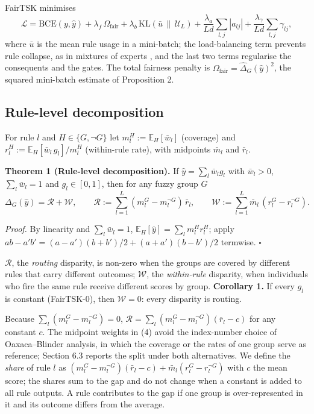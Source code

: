 FairTSK minimises \[\mathcal{L} = \mathrm{BCE}(y,\hat{y}) + \lambda_{f}\,\Omega_{\text{fair}} + \lambda_{b}\,\mathrm{KL}(\bar{u}\,\|\,\mathcal{U}_{L}) + \frac{\lambda_{a}}{Ld}\sum_{l,j}|a_{lj}| + \frac{\lambda_{\gamma}}{Ld}\sum_{l,j}\gamma_{lj}, \tag{3}\] where \(\bar{u}\) is the mean rule usage in a mini-batch; the load-balancing term prevents rule collapse, as in mixtures of experts \cite{shazeer}, and the last two terms regularise the consequents and the gates. The total fairness penalty is \(\Omega_{\text{fair}} = \hat{\Delta}_{G}(\hat y)^{2}\), the squared mini-batch estimate of Proposition 2.

\hypertarget{rule-level-decomposition}{%
\subsection{Rule-level decomposition}\label{rule-level-decomposition}}

For rule \(l\) and \(H \in \{G,\neg G\}\) let \(m_{l}^{H} := \mathbb{E}_{H}[\bar{w}_{l}]\) (coverage) and \(r_{l}^{H} := \mathbb{E}_{H}[\bar{w}_{l}\, g_{l}]/m_{l}^{H}\) (within-rule rate), with midpoints \(\bar{m}_{l}\) and \(\bar{r}_{l}\).

\textbf{Theorem 1 (Rule-level decomposition).} If \(\hat y = \sum_l \bar w_l g_l\) with \(\bar w_l > 0\), \(\sum_l \bar w_l = 1\) and \(g_l \in [0,1]\), then for any fuzzy group \(G\) \[\Delta_{G}(\hat{y}) = \mathcal{R} + \mathcal{W},\qquad \mathcal{R} := \sum_{l = 1}^{L}(m_{l}^{G} - m_{l}^{\neg G})\,\bar{r}_{l},\qquad \mathcal{W} := \sum_{l = 1}^{L}\bar{m}_{l}\,(r_{l}^{G} - r_{l}^{\neg G}). \tag{4}\]

\emph{Proof.} By linearity and \(\sum_l \bar w_l = 1\), \(\mathbb{E}_{H}[\hat{y}] = \sum_{l}m_{l}^{H}r_{l}^{H}\); apply \(ab - a'b' = (a - a')(b + b')/2 + (a + a')(b - b')/2\) termwise. \(\square\)

\(\mathcal R\), the \emph{routing} disparity, is non-zero when the groups are covered by different rules that carry different outcomes; \(\mathcal W\), the \emph{within-rule} disparity, when individuals who fire the same rule receive different scores by group. \textbf{Corollary 1.} If every \(g_l\) is constant (FairTSK-0), then \(\mathcal W = 0\): every disparity is routing.

Because \(\sum_l (m_l^G - m_l^{\neg G}) = 0\), \(\mathcal R = \sum_l (m_l^G - m_l^{\neg G})(\bar r_l - c)\) for any constant \(c\). The midpoint weights in (4) avoid the index-number choice of Oaxaca--Blinder analysis, in which the coverage or the rates of one group serve as reference; Section 6.3 reports the split under both alternatives. We define the \emph{share} of rule \(l\) as \((m_l^G - m_l^{\neg G})(\bar r_l - c) + \bar m_l (r_l^G - r_l^{\neg G})\) with \(c\) the mean score; the shares sum to the gap and do not change when a constant is added to all rule outputs. A rule contributes to the gap if one group is over-represented in it and its outcome differs from the average.

